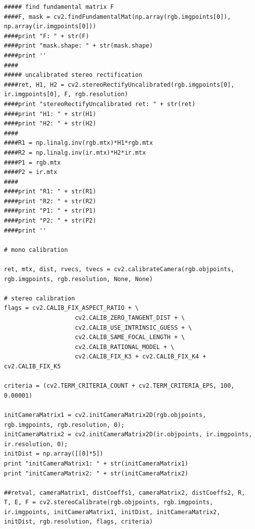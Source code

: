 \begin{appendices}
\begin{lstlisting}
##### find fundamental matrix F
####F, mask = cv2.findFundamentalMat(np.array(rgb.imgpoints[0]), np.array(ir.imgpoints[0]))
####print "F: " + str(F)
####print "mask.shape: " + str(mask.shape)
####print ''
####
##### uncalibrated stereo rectification
####ret, H1, H2 = cv2.stereoRectifyUncalibrated(rgb.imgpoints[0], ir.imgpoints[0], F, rgb.resolution)
####print "stereoRectifyUncalibrated ret: " + str(ret)
####print "H1: " + str(H1)
####print "H2: " + str(H2)
####
####R1 = np.linalg.inv(rgb.mtx)*H1*rgb.mtx
####R2 = np.linalg.inv(ir.mtx)*H2*ir.mtx
####P1 = rgb.mtx
####P2 = ir.mtx
####
####print "R1: " + str(R1)
####print "R2: " + str(R2)
####print "P1: " + str(P1)
####print "P2: " + str(P2)
####print ''

# mono calibration

ret, mtx, dist, rvecs, tvecs = cv2.calibrateCamera(rgb.objpoints, rgb.imgpoints, rgb.resolution, None, None)

# stereo calibration
flags = cv2.CALIB_FIX_ASPECT_RATIO + \
                    cv2.CALIB_ZERO_TANGENT_DIST + \
                    cv2.CALIB_USE_INTRINSIC_GUESS + \
                    cv2.CALIB_SAME_FOCAL_LENGTH + \
                    cv2.CALIB_RATIONAL_MODEL + \
                    cv2.CALIB_FIX_K3 + cv2.CALIB_FIX_K4 + cv2.CALIB_FIX_K5

criteria = (cv2.TERM_CRITERIA_COUNT + cv2.TERM_CRITERIA_EPS, 100, 0.00001)

initCameraMatrix1 = cv2.initCameraMatrix2D(rgb.objpoints, rgb.imgpoints, rgb.resolution, 0);
initCameraMatrix2 = cv2.initCameraMatrix2D(ir.objpoints, ir.imgpoints, ir.resolution, 0);
initDist = np.array([[0]*5])
print "initCameraMatrix1: " + str(initCameraMatrix1)
print "initCameraMatrix2: " + str(initCameraMatrix2)
    
##retval, cameraMatrix1, distCoeffs1, cameraMatrix2, distCoeffs2, R, T, E, F = cv2.stereoCalibrate(rgb.objpoints, rgb.imgpoints, ir.imgpoints, initCameraMatrix1, initDist, initCameraMatrix2, initDist, rgb.resolution, flags, criteria)


\end{lstlisting}
\end{appendices}
